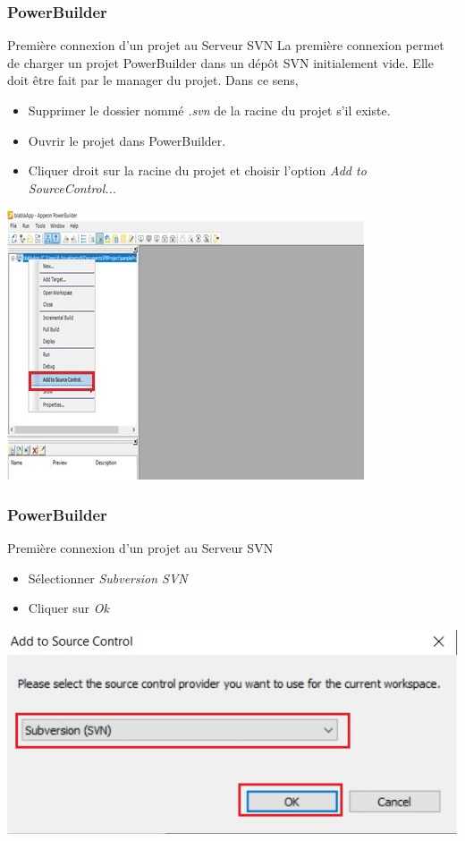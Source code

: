 \documentclass{beamer}
\begin{document}
\begin{frame}
\frametitle{PowerBuilder}
\begin{block}{Première connexion d'un projet au Serveur SVN}
La première connexion permet de charger un projet PowerBuilder dans un dépôt SVN initialement vide. Elle doit être fait par le manager du projet. Dans ce sens,
\begin{itemize}
\item Supprimer le dossier nommé \alert{\textit{.svn}} de la racine du projet s'il existe.
\item Ouvrir le projet dans PowerBuilder.
\item Cliquer droit sur la racine du projet et choisir l'option \alert{\textit{Add to SourceControl..}}.
\end{itemize}
\end{block}
\includegraphics[scale=.7]{../images/connect4.jpg}
\end{frame}

\begin{frame}
\frametitle{PowerBuilder}
\begin{block}{Première connexion d'un projet au Serveur SVN}

\begin{itemize}
\item Sélectionner \alert{\textit{Subversion SVN}}
\item Cliquer sur \alert{\textit{Ok}}
\end{itemize}
\end{block}

\includegraphics[scale=.7]{../images/connect5.jpg}
\end{frame}
\end{document}
